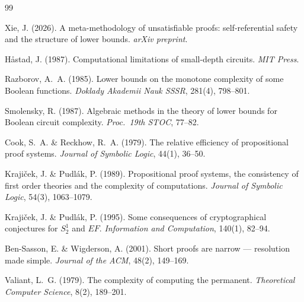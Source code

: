 \documentclass[11pt,a4paper]{article}
\begin{document}
\begin{thebibliography}{99}

Xie, J. (2026).
A meta-methodology of unsatisfiable proofs: self-referential safety and the structure of lower bounds.
\textit{arXiv preprint}.

H\r{a}stad, J. (1987).
Computational limitations of small-depth circuits.
\textit{MIT Press}.

Razborov, A.~A. (1985).
Lower bounds on the monotone complexity of some Boolean functions.
\textit{Doklady Akademii Nauk SSSR}, 281(4), 798--801.

Smolensky, R. (1987).
Algebraic methods in the theory of lower bounds for Boolean circuit complexity.
\textit{Proc.\ 19th STOC}, 77--82.

Cook, S.~A. \& Reckhow, R.~A. (1979).
The relative efficiency of propositional proof systems.
\textit{Journal of Symbolic Logic}, 44(1), 36--50.

Kraji\v{c}ek, J. \& Pudl\'{a}k, P. (1989).
Propositional proof systems, the consistency of first order theories and the complexity of computations.
\textit{Journal of Symbolic Logic}, 54(3), 1063--1079.

Kraji\v{c}ek, J. \& Pudl\'{a}k, P. (1995).
Some consequences of cryptographical conjectures for $S^1_2$ and $EF$.
\textit{Information and Computation}, 140(1), 82--94.

Ben-Sasson, E. \& Wigderson, A. (2001).
Short proofs are narrow --- resolution made simple.
\textit{Journal of the ACM}, 48(2), 149--169.

Valiant, L.~G. (1979).
The complexity of computing the permanent.
\textit{Theoretical Computer Science}, 8(2), 189--201.

\end{thebibliography}
\end{document}
